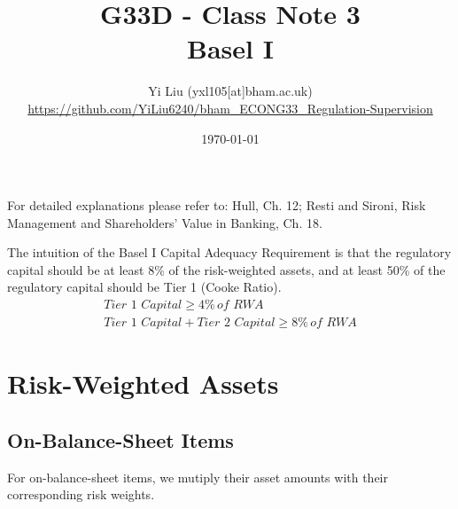 \documentclass[12pt]{article} 
\author{Yi Liu
  (yxl105[at]bham.ac.uk)\\\scriptsize{\url{https://github.com/YiLiu6240/bham_ECONG33_Regulation-Supervision}}}
\title{G33D - Class Note 3\\Basel I}
\date{\today}
\begin{document}
\maketitle
\tableofcontents
\newpage

For detailed explanations please refer to: Hull, Ch. 12; Resti and Sironi, Risk
Management and Shareholders’ Value in Banking, Ch. 18.

The intuition of the Basel I Capital Adequacy Requirement is that the regulatory
capital should be at least 8\% of the risk-weighted assets, and at least 50\% of
the regulatory capital should be Tier 1 (Cooke Ratio).
\begin{align*}
  \textit{Tier 1 Capital} \geq 4\% \, \textit{of RWA} \\
  \textit{Tier 1 Capital} + \textit{Tier 2 Capital} \geq 8\% \, \textit{of RWA}
\end{align*}

\section{Risk-Weighted Assets}

\subsection{On-Balance-Sheet Items}

For on-balance-sheet items, we mutiply their asset amounts with their
corresponding risk weights.
\end{document}
